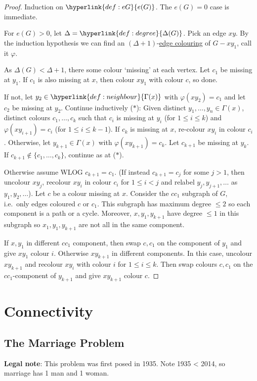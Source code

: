 \documentclass{article}
\begin{document}
\begin{proof}
    Induction on $\hyperlink{def:eG}{e(G)}$. The $e(G) = 0$ case is immediate.

    For $e(G) > 0$, let $\Delta = \hyperlink{def:degree}{\Delta(G)}$. Pick an edge $xy$.
    By the induction hypothesis we can find an $(\Delta+1)$-\hyperlink{def:eColour}{edge colouring} of $G - x y_1$, call it $\varphi$.

    As $\Delta(G) < \Delta + 1$, there some colour `missing' at each vertex.
    Let $c_1$ be missing at $y_1$. If $c_1$ is also missing at $x$, then colour $xy_1$ with colour $c$, so done.

    If not, let $y_2 \in \hyperlink{def:neighbour}{\Gamma(x)}$ with $\varphi(x y_2) = c_1$ and let $c_2$ be missing at $y_2$.
    Continue inductively ($*$):
    Given distinct $y_1, \dotsc, y_n \in \Gamma(x)$, distinct colours $c_1, \dotsc, c_k$ such that $c_i$ is missing at $y_i$ (for $1 \leq i \leq k$) and $\varphi(x y_{i+1}) = c_i$ (for $1 \leq i \leq k-1$).
    If $c_k$ is missing at $x$, re-colour $xy_i$ in colour $c_i$.
    Otherwise, let $y_{k+1} \in \Gamma(x)$ with $\varphi(x y_{k+1}) = c_k$.
    Let $c_{k+1}$ be missing at $y_k$. If $c_{k+1} \notin \{c_1, \dotsc, c_k\}$, continue as at ($*$).

    Otherwise assume WLOG $c_{k+1} = c_1$. (If instead $c_{k+1} = c_j$ for some $j > 1$, then uncolour $xy_j$, recolour $x y_i$ in colour $c_i$ for $1 \leq i < j$ and relabel $y_j, y_{j+1}, \dotsc$ as $y_1, y_2, \dotsc$).
    Let $c$ be a colour missing at $x$.
    Consider the $cc_1$ subgraph of $G$, i.e.\ only edges coloured $c$ or $c_1$.
    This subgraph has maximum degree $\leq 2$ so each component is a path or a cycle.
    Moreover, $x,y_1,y_{k+1}$ have degree $\leq 1$ in this subgraph so $x_1, y_1, y_{k+1}$ are not all in the same component.

    If $x,y_1$ in different $c c_1$ component, then swap $c,c_1$ on the component of $y_1$ and give $x y_1$ colour $i$.
    Otherwise $x y_{k+1}$ in different components. In this case, uncolour $x y_{k+1}$ and recolour $x y_i$ with colour $i$ for $1 \leq i \leq k$.
    Then swap colours $c,c_1$ on the $c c_1$-component of $y_{k+1}$ and give $x y_{k+1}$ colour $c$.
\end{proof}

\clearpage
\section{Connectivity}
\subsection{The Marriage Problem}
\textbf{Legal note}: This problem was first posed in 1935. Note 1935 < 2014, so marriage has 1 man and 1 woman.
\end{document}
